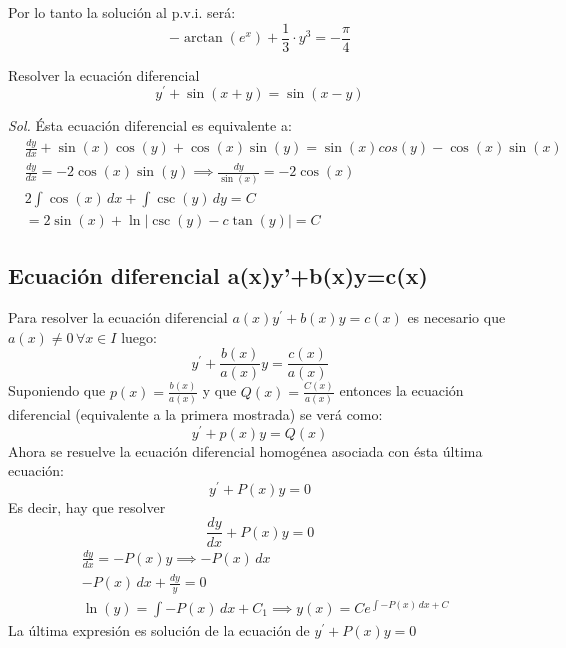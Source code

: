 Por lo tanto la solución al p.v.i. será: 
\begin{equation*}
    -\arctan{(e^x)}+\frac{1}{3}\cdot y^3=-\frac{\pi}{4}
\end{equation*}

\begin{example}
    Resolver la ecuación diferencial
    \begin{equation*}
        y^{\prime}+\sin{(x+y)}=\sin{(x-y)}
    \end{equation*}
\end{example}

\textit{ Sol. }
Ésta ecuación diferencial es equivalente a:
\begin{align*}
    &\frac{dy}{dx}+\sin{(x)}\cos{(y)}+\cos{(x)}\sin{(y)}=\sin{(x)}cos{(y)}-\cos{(x)}\sin{(x)}\\
    &\frac{dy}{dx}=-2\cos{(x)}\sin{(y)}\implies \frac{dy}{\sin{(x)}}=-2\cos{(x)}\\
    &2\int \cos{(x)}\, dx+\int \csc{(y)}\, dy=C\\
    &=2\sin{(x)}+\ln{\left\lvert \csc{(y)}-c\tan{(y)}\right\rvert}=C
\end{align*}

\subsection{Ecuación diferencial a(x)y'+b(x)y=c(x)}

Para resolver la ecuación diferencial $a(x)y^{\prime}+b(x)y=c(x)$ es necesario que $a(x)\neq 0\, \forall x\in I$ luego:
\begin{equation*}
    y^{\prime}+\frac{b(x)}{a(x)}y=\frac{c(x)}{a(x)}
\end{equation*}
Suponiendo que $p(x)=\frac{b(x)}{a(x)}$ y que $Q(x)=\frac{C(x)}{a(x)}$
entonces la ecuación diferencial (equivalente a la primera mostrada) se verá como: 
\begin{equation}
    y^{\prime}+p(x)y=Q(x)
\end{equation}
Ahora se resuelve la ecuación diferencial homogénea asociada con ésta última ecuación: 
\begin{equation*}
    y^{\prime}+P(x)y=0
\end{equation*}
Es decir, hay que resolver
\begin{equation*}
    \frac{dy}{dx}+P(x)y=0
\end{equation*}
\begin{align*}
    &\frac{dy}{dx}=-P(x)y\implies -P(x)\, dx\\
    &-P(x)\, dx+\frac{dy}{y}=0\\
    &\ln{(y)}=\int -P(x)\, dx+C_1 \implies y(x)=Ce^{\int -P(x)\, dx+C}
\end{align*}
La última expresión es solución de la ecuación de $y^{\prime}+P(x)y=0$

